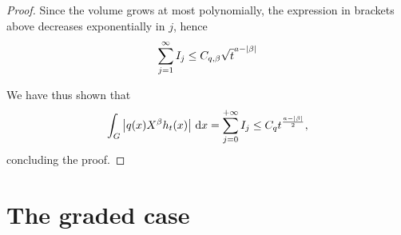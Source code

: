\begin{proof}
    Since the volume grows at most polynomially,
    the expression in brackets above decreases exponentially in $j$,
    hence
    \begin{align*}
        \sum_{j = 1}^\infty I_j \leq C_{q, \beta} \sqrt t^{a - \left|{\beta}\right|}
    \end{align*}

    We have thus shown that
    \begin{align*}
        \int_\Group \abs {q(x) \LeftDifferentialOperator \beta h_t(x)} \dd x
        = \sum_{j = 0}^{+\infty} I_j \leq C_q t^{\frac{a - \abs \beta} 2},
    \end{align*}
    concluding the proof.
\end{proof}

\section{The graded case}
